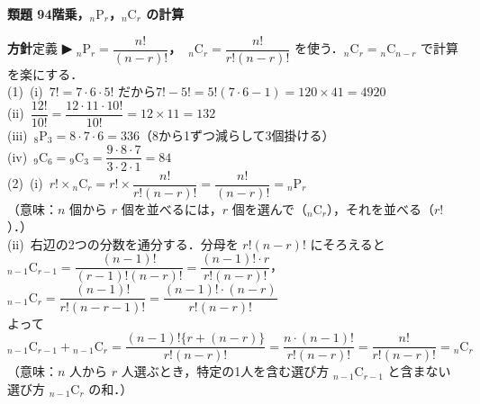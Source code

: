 \documentclass[a4paper,11pt]{ltjsarticle}
\newcommand{\ans}[2]{\Needspace{5\baselineskip}\vspace{6pt}%
  {\sffamily\bfseries 類題 #1\quad #2}\par}
\newcommand{\point}[1]{\textsf{\bfseries ▶ #1}}
\begin{document}
\ans{94}{階乗，${}_n\mathrm P_r$，${}_n\mathrm C_r$ の計算}
\begin{kai}
\textbf{方針}\quad 定義 \point{${}_n\mathrm P_r=\dfrac{n!}{(n-r)!}$，\ ${}_n\mathrm C_r=\dfrac{n!}{r!(n-r)!}$} を使う．${}_n\mathrm C_r={}_n\mathrm C_{n-r}$ で計算を楽にする．\\[2pt]
(1)\ (i)\ $7!=7\cdot6\cdot5!$ だから\quad $7!-5!=5!(7\cdot6-1)=120\times41=4920$\\[2pt]
\hspace*{1.5em}(ii)\ $\dfrac{12!}{10!}=\dfrac{12\cdot11\cdot10!}{10!}=12\times11=132$\\[2pt]
\hspace*{1.5em}(iii)\ ${}_8\mathrm P_3=8\cdot7\cdot6=336$\quad （8から1ずつ減らして3個掛ける）\\[2pt]
\hspace*{1.5em}(iv)\ ${}_9\mathrm C_6={}_9\mathrm C_3=\dfrac{9\cdot8\cdot7}{3\cdot2\cdot1}=84$\\[2pt]
(2)\ (i)\ $r!\times{}_n\mathrm C_r=r!\times\dfrac{n!}{r!(n-r)!}=\dfrac{n!}{(n-r)!}={}_n\mathrm P_r$\\
\hspace*{1.5em}（意味：$n$ 個から $r$ 個を並べるには，$r$ 個を選んで（${}_n\mathrm C_r$），それを並べる（$r!$）．）\\[2pt]
\hspace*{1.5em}(ii)\ 右辺の2つの分数を通分する．分母を $r!(n-r)!$ にそろえると\\
\hspace*{1.5em}${}_{n-1}\mathrm C_{r-1}=\dfrac{(n-1)!}{(r-1)!(n-r)!}=\dfrac{(n-1)!\cdot r}{r!(n-r)!}$，\quad
${}_{n-1}\mathrm C_r=\dfrac{(n-1)!}{r!(n-r-1)!}=\dfrac{(n-1)!\cdot(n-r)}{r!(n-r)!}$\\[2pt]
\hspace*{1.5em}よって\quad ${}_{n-1}\mathrm C_{r-1}+{}_{n-1}\mathrm C_r=\dfrac{(n-1)!\{r+(n-r)\}}{r!(n-r)!}=\dfrac{n\cdot(n-1)!}{r!(n-r)!}=\dfrac{n!}{r!(n-r)!}={}_n\mathrm C_r$\\
\hspace*{1.5em}（意味：$n$ 人から $r$ 人選ぶとき，特定の1人を含む選び方 ${}_{n-1}\mathrm C_{r-1}$ と含まない選び方 ${}_{n-1}\mathrm C_r$ の和．）
\end{kai}
\end{document}
